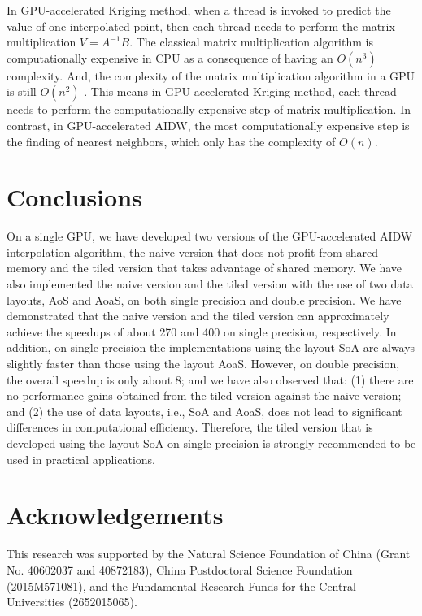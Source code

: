 \documentclass[fleqn,11pt]{wlscirep}
\begin{document}
In GPU-accelerated Kriging method, when a thread is invoked to predict the 
value of one interpolated point, then each thread needs to perform the 
matrix multiplication $V=A^{-1}B$. The classical matrix multiplication 
algorithm is computationally expensive in CPU as a consequence of having an 
$O(n^{3})$ complexity. And, the complexity of the matrix multiplication 
algorithm in a GPU is still $O(n^{2})$ \cite{18}. This means 
in GPU-accelerated Kriging method, each thread needs to perform the 
computationally expensive step of matrix multiplication. In contrast, in 
GPU-accelerated AIDW, the most computationally expensive step is the finding 
of nearest neighbors, which only has the complexity of $O(n)$.

\section{Conclusions}\label{sec6}
On a single GPU, we have developed two versions of the GPU-accelerated AIDW 
interpolation algorithm, the naive version that does not profit from shared 
memory and the tiled version that takes advantage of shared memory. We have 
also implemented the naive version and the tiled version with the use of two 
data layouts, AoS and AoaS, on both single precision and double precision. 
We have demonstrated that the naive version and the tiled version can 
approximately achieve the speedups of about 270 and 400 on single precision, 
respectively. In addition, on single precision the implementations using the 
layout SoA are always slightly faster than those using the layout AoaS. 
However, on double precision, the overall speedup is only about 8; and we 
have also observed that: (1) there are no performance gains obtained from 
the tiled version against the naive version; and (2) the use of data 
layouts, i.e., SoA and AoaS, does not lead to significant differences in 
computational efficiency. Therefore, the tiled version that is developed 
using the layout SoA on single precision is strongly recommended to be used 
in practical applications. 


\section*{Acknowledgements}
This research was supported by the Natural Science Foundation of China 
(Grant No. 40602037 and 40872183), China Postdoctoral Science Foundation 
(2015M571081), and the Fundamental Research Funds for the Central 
Universities (2652015065).



\end{document}
